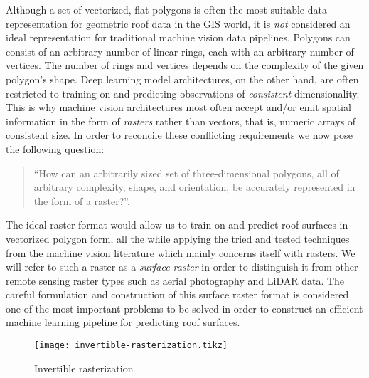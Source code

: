 Although a set of vectorized, flat polygons is often the most suitable data representation for geometric roof data in the GIS world, it is \emph{not} considered an ideal representation for traditional machine vision data pipelines.
Polygons can consist of an arbitrary number of linear rings, each with an arbitrary number of vertices.
The number of rings and vertices depends on the complexity of the given polygon's shape.
Deep learning model architectures, on the other hand, are often restricted to training on and predicting observations of \emph{consistent} dimensionality.
This is why machine vision architectures most often accept and/or emit spatial information in the form of \emph{rasters} rather than vectors, that is, numeric arrays of consistent size.
In order to reconcile these conflicting requirements we now pose the following question:
%
\begin{quotation}
  \enquote{How can an arbitrarily sized set of three-dimensional polygons, all of arbitrary complexity, shape, and orientation, be accurately represented in the form of a raster?}.
\end{quotation}
%
The ideal raster format would allow us to train on and predict roof surfaces in vectorized polygon form, all the while applying the tried and tested techniques from the machine vision literature which mainly concerns itself with rasters.
We will refer to such a raster as a \textit{surface raster} in order to distinguish it from other remote sensing raster types such as aerial photography and LiDAR data.
The careful formulation and construction of this surface raster format is considered one of the most important problems to be solved in order to construct an efficient machine learning pipeline for predicting roof surfaces.
\begin{figure}
  \begin{center}
    \texttt{[image: invertible-rasterization.tikz]}
  \end{center}
  \vspace{-1.5em}
  \caption{Invertible rasterization}
  \label{fig:invertible-rasterization}
  \vspace{-1.5em}
\end{figure}

